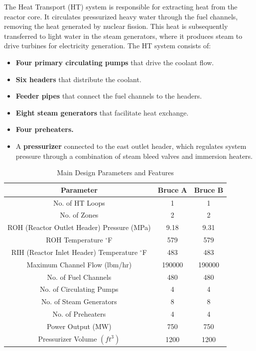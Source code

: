 \documentclass[12pt]{article}
\begin{document}
\begin{multicols}{2}
The Heat Transport (HT) system is responsible for extracting heat from the reactor core. It circulates pressurized heavy water through the fuel channels, removing the heat generated by nuclear fission. This heat is subsequently transferred to light water in the steam generators, where it produces steam to drive turbines for electricity generation. The HT system consists of:
\begin{itemize}
    \item \textbf{Four primary circulating pumps} that drive the coolant flow.
    \item \textbf{Six headers} that distribute the coolant.
    \item \textbf{Feeder pipes} that connect the fuel channels to the headers.
    \item \textbf{Eight steam generators} that facilitate heat exchange.
    \item \textbf{Four preheaters.}
    \item A \textbf{pressurizer} connected to the east outlet header, which regulates system pressure through a combination of steam bleed valves and immersion heaters.
\end{itemize}

\end{multicols}

\begin{table}
    \centering
\caption{Main Design Parameters and Features}
\label{tab:tab_1}
    \begin{tabular}{ccc} 
    \hline
    Parameter & Bruce A  & Bruce B \\ 
    \hline
    No. of HT Loops & 1  & 1 \\ 
    No. of Zones & 2 & 2 \\ 
    ROH (Reactor Outlet Header) Pressure (MPa) & 9.18 & 9.31 \\ 
    ROH Temperature $^{\circ}$F & 579 & 579 \\ 
    RIH (Reactor Inlet Header) Temperature $^{\circ}$F & 483 & 483\\ 
    Maximum Channel Flow (lbm/hr) & 190000 & 190000\\ 
    No. of Fuel Channels & 480 & 480\\ 
    No. of Circulating Pumps & 4 & 4\\ 
    No. of Steam Generators & 8 & 8\\ 
    No. of Preheaters & 4 & 4 \\ 
    Power Output (MW) & 750 & 750 \\ 
    Pressurizer Volume $(ft^3)$ & 1200 & 1200 \\ 
    \hline
         
    \end{tabular}
    
\end{table}
\end{document}
